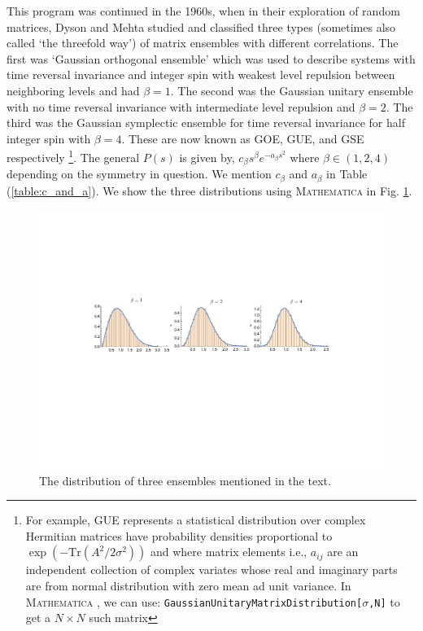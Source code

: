 \documentclass[11pt]{article}
\newcommand{\MA}{\textsc{Mathematica }}
\begin{document}
This program was continued in the 1960s, when in their exploration of random matrices, Dyson and Mehta studied and classified three types (sometimes also called `the threefold way') of matrix ensembles with different correlations. The first was `Gaussian orthogonal ensemble' which was used to describe systems with time reversal invariance and integer spin with weakest level repulsion between neighboring levels and had $\beta=1$. The second was the Gaussian unitary ensemble with no time reversal invariance with intermediate level repulsion and $\beta=2$. The third was the Gaussian symplectic ensemble for time reversal invariance for half integer spin with $\beta=4$. These are now known as GOE, GUE, and GSE respectively \footnote{For example, GUE represents a statistical distribution over complex Hermitian matrices 
have probability densities proportional to $ \exp(-\mbox{Tr}(A^2/2\sigma^2))$ and
where matrix elements i.e., $a_{ij}$ are an independent collection of complex 
variates whose real and imaginary parts are from normal distribution
with zero mean ad unit variance. In \MA, we can use: 
\texttt{GaussianUnitaryMatrixDistribution[$\sigma$,N]}
to get a $N \times N$ such matrix}. 
The general $P(s)$ is given by, $c_{\beta}s^{\beta} e^{-a_{\beta}s^2}$ 
where $\beta \in (1,2,4)$ depending on the symmetry in question. 
We mention $c_{\beta}$ and  $a_{\beta}$ in Table (\ref{table:c_and_a}). 
We show the three distributions using \MA in Fig. \ref{fig:ensem1}.  

\begin{figure}[htbp] 
	\centering 
	\includegraphics[width=1.05\textwidth]{figs/ensem.pdf}
	\caption{\label{fig:ensem1}The distribution of three ensembles mentioned in the text.}
\end{figure}
\end{document}
